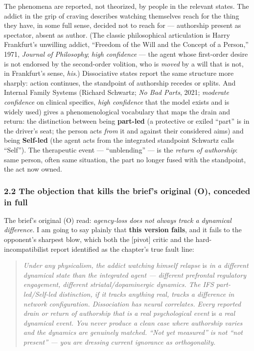 \documentclass[11pt]{article}
\begin{document}
The phenomena are reported, not theorized, by people in the relevant states. The addict in the grip of craving describes watching themselves reach for the thing they have, in some full sense, decided not to reach for — authorship present as spectator, absent as author. (The classic philosophical articulation is Harry Frankfurt's unwilling addict, ``Freedom of the Will and the Concept of a Person,'' 1971, \emph{Journal of Philosophy}; \emph{high confidence} — the agent whose first-order desire is not endorsed by the second-order volition, who is \emph{moved} by a will that is not, in Frankfurt's sense, \emph{his}.) Dissociative states report the same structure more sharply: action continues, the standpoint of authorship recedes or splits. And Internal Family Systems (Richard Schwartz; \emph{No Bad Parts}, 2021; \emph{moderate confidence} on clinical specifics, \emph{high confidence} that the model exists and is widely used) gives a phenomenological vocabulary that maps the drain and return: the distinction between being \textbf{part-led} (a protective or exiled ``part'' is in the driver's seat; the person acts \emph{from} it and against their considered aims) and being \textbf{Self-led} (the agent acts from the integrated standpoint Schwartz calls ``Self''). The therapeutic event — ``unblending'' — is the \emph{return of authorship}: same person, often same situation, the part no longer fused with the standpoint, the act now owned.

\subsubsection*{2.2 The objection that kills the brief's original (O), conceded in full}

The brief's original (O) read: \emph{agency-loss does not always track a dynamical difference.} I am going to say plainly that \textbf{this version fails}, and it fails to the opponent's sharpest blow, which both the [pivot] critic and the hard-incompatibilist report identified as the chapter's true fault line:

\begin{quote}
\emph{Under any physicalism, the addict watching himself relapse} is \emph{in a different dynamical state than the integrated agent — different prefrontal regulatory engagement, different striatal/\allowbreak{}dopaminergic dynamics. The IFS part-led/\allowbreak{}Self-led distinction, if it tracks anything real, tracks a difference in network configuration. Dissociation has neural correlates. Every reported drain or return of authorship that is a real psychological event} is \emph{a real dynamical event. You never produce a clean case where authorship varies and the dynamics are genuinely matched. ``Not yet measured'' is not ``not present'' — you are dressing current ignorance as orthogonality.}
\end{quote}
\end{document}

